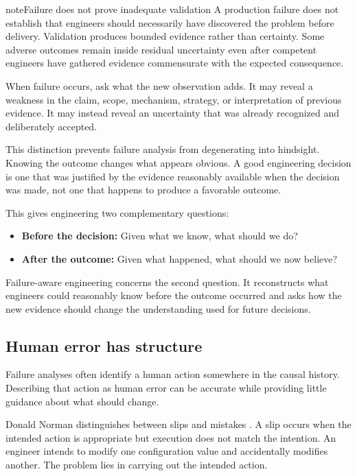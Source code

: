 \begin{bookbox}{note}{Failure does not prove inadequate validation} %
A production failure does not establish that engineers should necessarily have discovered the
problem before delivery. Validation produces bounded evidence rather than certainty. Some adverse
outcomes remain inside residual uncertainty even after competent engineers have gathered evidence
commensurate with the expected consequence.

When failure occurs, ask what the new observation adds. It may reveal a weakness in the claim,
scope, mechanism, strategy, or interpretation of previous evidence. It may instead reveal an
uncertainty that was already recognized and deliberately accepted.
\end{bookbox}

This distinction prevents failure analysis from degenerating into hindsight. Knowing the outcome
changes what appears obvious. A good engineering decision is one that was justified by the
evidence reasonably available when the decision was made, not one that happens to produce a
favorable outcome.

This gives engineering two complementary questions:

\begin{itemize}
\tightlist
\item
  \textbf{Before the decision:} Given what we know, what should we do?
\item
  \textbf{After the outcome:} Given what happened, what should we now believe?
\end{itemize}

Failure-aware engineering concerns the second question. It reconstructs what engineers could
reasonably know before the outcome occurred and asks how the new evidence should change the
understanding used for future decisions.

\subsection{Human error has structure}\label{sec-human-error}

Failure analyses often identify a human action somewhere in the causal history. Describing that
action as human error can be accurate while providing little guidance about what should change.

Donald Norman distinguishes between slips and mistakes \citep{norman2013}. A slip occurs when the
intended action is appropriate but execution does not match the intention. An engineer intends to
modify one configuration value and accidentally modifies another. The problem lies in carrying out
the intended action.

